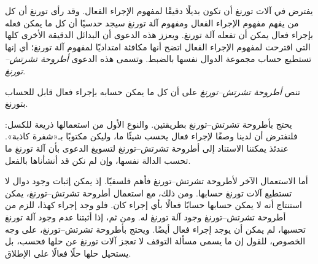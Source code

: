 \documentclass[../../../include/open-logic-section]{subfiles}
\begin{document}

يفترض في آلات تورنغ أن تكون بديلًا دقيقًا لمفهوم الإجراء الفعال. وقد
رأى تورنغ أن كل من يفهم مفهوم الإجراء الفعال ومفهوم آلة تورنغ سيجد
حدسيًا أن كل ما يمكن فعله بإجراء فعال يمكن أن تفعله آلة تورنغ. ويعزز
هذه الدعوى أن البدائل الدقيقة الأخرى كلها التي اقترحت لمفهوم الإجراء
الفعال اتضح أنها مكافئة امتداديًا لمفهوم آلة تورنغ؛ أي إنها تستطيع
حساب مجموعة الدوال نفسها بالضبط. وتسمى هذه الدعوى \emph{أطروحة
تشرتش--تورنغ}.

\begin{defn}
تنص \emph{أطروحة تشرتش--تورنغ} على أن كل ما يمكن حسابه بإجراء فعال
قابل للحساب بتورنغ.
\end{defn}

يحتج بأطروحة تشرتش--تورنغ بطريقتين. والنوع الأول من استعمالها ذريعة
للكسل: فلنفترض أن لدينا وصفًا لإجراء فعال يحسب شيئًا ما، وليكن مكتوبًا
بـ«شفرة كاذبة». عندئذ يمكننا الاستناد إلى أطروحة تشرتش--تورنغ لتسويغ
الدعوى بأن آلة تورنغ ما تحسب الدالة نفسها، وإن لم نكن قد أنشأناها
بالفعل.

أما الاستعمال الآخر لأطروحة تشرتش--تورنغ فأهم فلسفيًا. إذ يمكن إثبات
وجود دوال لا تستطيع آلات تورنغ حسابها. ومن ذلك، مع استعمال أطروحة
تشرتش--تورنغ، يمكن استنتاج أنه لا يمكن حسابها حسابًا فعالًا بأي إجراء
كان. فلو وجد إجراء كهذا، للزم من أطروحة تشرتش--تورنغ وجود آلة تورنغ
له. ومن ثم، إذا أثبتنا عدم وجود آلة تورنغ تحسبها، لم يمكن أن يوجد
إجراء فعال أيضًا. ويحتج بأطروحة تشرتش--تورنغ، على وجه الخصوص، للقول
إن ما يسمى مسألة التوقف لا تعجز آلات تورنغ عن حلها فحسب، بل يستحيل
حلها حلًا فعالًا على الإطلاق.
\end{document}
